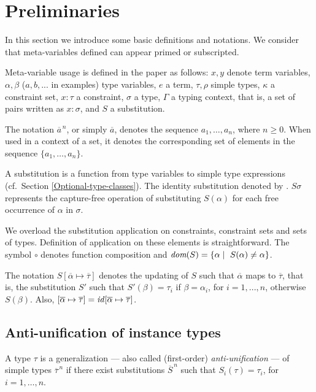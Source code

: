 \section{Preliminaries}\label{prelimirares}

In this section we introduce some basic definitions and notations. We
consider that meta-variables defined can appear primed or subscripted.

Meta-variable usage is defined in the paper as follows: $x,y$ denote
term variables, $\alpha, \beta$ ($a, b,...$
in examples) type variables, $e$ a term,
$\tau,\rho$ simple types, $\kappa$ a constraint set, $x:\tau$ a
constraint, $\sigma$ a type, $\Gamma$ a typing context, that is, a set
of pairs written as $x:\sigma$, and $S$ a substitution.

The notation $\overline{a}^{\,n}$, or simply $\overline{a}$, denotes the
sequence $a_1,\ldots,a_n$, where $n \geq 0$. When used in a context of
a set, it denotes the corresponding set of elements in the sequence
$\{a_1,\ldots,a_n\}$.

A substitution is a function from type variables to simple type
expressions (cf.~Section \ref{Optional-type-classes}). The identity substitution
denoted by \id. $S\sigma$ represents the capture-free operation of
substituting $S(\alpha)$ for each free occurrence of $\alpha$ in
$\sigma$.

We overload the substitution application on constraints, constraint sets
and sets of types. Definition of application on these elements is
straightforward. The symbol $\circ$ denotes function composition and
$\textit{dom}(S)=\{\alpha \mid\ S(\alpha) \neq \alpha\}$.

The notation $S[\overline{\alpha}\mapsto\overline{\tau}]$ denotes the
updating of $S$ such that $\overline{\alpha}$ maps to
$\overline{\tau}$, that is, the substitution $S'$ such that $S'(\beta)
= \tau_i$ if $\beta = \alpha_i$, for $i = 1,...,n$, otherwise
$S(\beta)$. Also, $[\overline{\alpha}\mapsto\overline{\tau}] =
\text{\it id\/}[\overline{\alpha}\mapsto\overline{\tau}]$.


\subsection{Anti-unification of instance types}
\label{sec:anti-unif}

A type $\tau$ is a generalization --- also called (first-order) 
{\em anti-unification\/} \cite{ModelTheory2012} --- of simple types
$\overline{\tau}^{\,n}$ if there exist substitutions
$\overline{S}^{\,n}$ such that $S_i(\tau)=\tau_i$, for $i=1,\ldots,n$.

